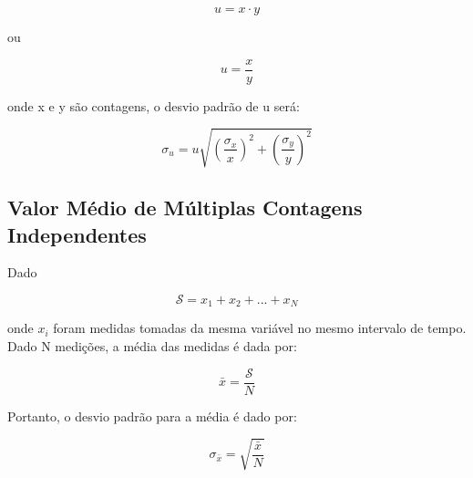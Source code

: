 \documentclass[11pt,a4paper]{article}
\begin{document}
			\begin{equation*}
				u = x \cdot y
			\end{equation*}

		\noindent ou

			\begin{equation*}
				u = \frac{x}{y}
			\end{equation*}

		\noindent onde x e y são contagens, o desvio padrão de u será:

			\begin{equation}
				\sigma_u = u \sqrt{\left(\frac{\sigma_x}{x}\right)^2 + \left(\frac{\sigma_y}{y}\right)^2}
			\end{equation}

	\subsection{Valor Médio de Múltiplas Contagens Independentes}

		Dado 

			\begin{equation*}
				\mathcal{S} = x_1 + x_2 + ... + x_N
			\end{equation*}

		\noindent onde $x_i$ foram medidas tomadas da mesma variável no mesmo intervalo de tempo. Dado N medições, a média das medidas é dada por:

			\begin{equation*}
				\bar{x} = \frac{\mathcal{S}}{N}
			\end{equation*}

		\noindent Portanto, o desvio padrão para a média é dado por:

			\begin{equation}
				\sigma_{\bar{x}} = \sqrt{\frac{\bar{x}}{N}}
			\end{equation}



	


\end{document}

